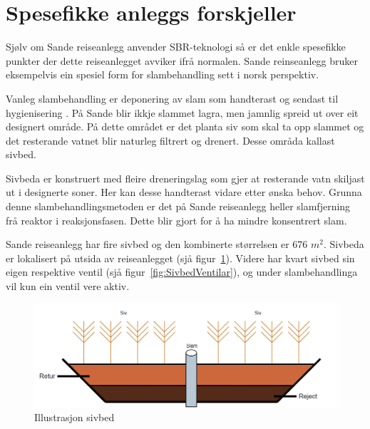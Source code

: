 \newpage
\section{Spesefikke anleggs forskjeller}
\thispagestyle{fancy}

Sjølv om Sande reiseanlegg anvender \gls{SBR}-teknologi så er det enkle spesefikke
punkter der dette reiseanlegget avviker ifrå normalen. 
Sande reinseanlegg bruker eksempelvis ein spesiel form for slambehandling sett i norsk perspektiv.

Vanleg slambehandling er deponering av slam som handterast og sendast til \gls{hygienisering} \citep{Slam}.
På Sande blir ikkje slammet lagra, men jamnlig spreid ut over eit designert område. På dette området er
det planta siv som skal ta opp slammet og det resterande vatnet blir naturleg filtrert og drenert.
Desse områda kallast sivbed.

Sivbeda er konstruert med fleire dreneringslag som gjer at resterande vatn skiljast ut i designerte soner.
Her kan desse handterast vidare etter ønska behov. 
Grunna denne slambehandlingsmetoden er det på Sande reiseanlegg heller slamfjerning frå reaktor
i reaksjonsfasen. Dette blir gjort for å ha mindre konsentrert slam.

Sande reiseanlegg har fire sivbed og den kombinerte størrelsen er 676 $m^2$. Sivbeda er lokalisert på utsida av reiseanlegget (sjå figur~\ref{fig:Sivbed}).\newline
Videre har kvart sivbed sin eigen respektive ventil (sjå figur~\ref{fig:SivbedVentilar}), og under slambehandlinga vil kun ein ventil vere aktiv. 
 

\begin{figure}[htbp]
    \centering
    \includegraphics[width=1\textwidth]{Figurar/Sivbed.png}
    \caption{Illustrasjon sivbed}\label{fig:Sivbed}
\end{figure}

\newpage

